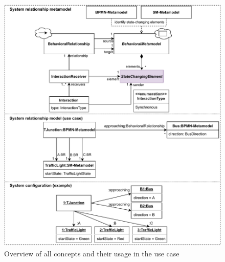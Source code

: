 \documentclass{jot}
\begin{document}




\begin{figure}[ht]
    \centering
    \includegraphics[width=1\textwidth]{figures/allConcepts.pdf}
    \caption{Overview of all concepts and their usage in the use case}
    \label{fig:allConcepts}
\end{figure}
\end{document}
